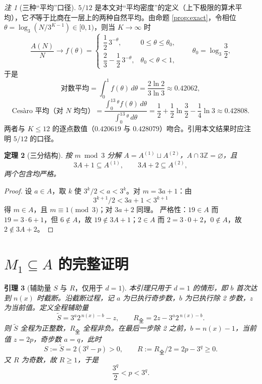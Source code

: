 \documentclass[11pt]{article}
\newtheorem{theorem}{定理}[section]
\newtheorem{lemma}[theorem]{引理}
\theoremstyle{definition}
\theoremstyle{definition}
\theoremstyle{remark}
\newtheorem{remark}[theorem]{注}
\begin{document}
\begin{remark}[三种“平均”口径]\label{rem:average}
\(5/12\) 是本文对“平均密度”的定义（上下极限的算术平均），它\emph{不}等于比商在一层上的两种自然平均。由命题 \ref{prop:exact}，令相位 \(\theta=\log_3(N/3^{K-1})\in[0,1)\)，则当 \(K\to\infty\) 时
\[
\frac{A(N)}{N}\longrightarrow f(\theta)=
\begin{cases}
\dfrac12\,3^{-\theta}, & 0\le\theta\le\theta_0,\\[2mm]
\dfrac23-\dfrac12\,3^{-\theta}, & \theta_0<\theta<1,
\end{cases}
\qquad \theta_0=\log_3\frac32,
\]
于是
\[
\text{对数平均}=\int_0^1f(\theta)\,d\theta=\frac{2\ln2}{3\ln3}\approx0.42062,
\]
\[
\text{Cesàro 平均（对 \(N\) 均匀）}
=\frac{\int_0^13^\theta f(\theta)\,d\theta}{\int_0^13^\theta\,d\theta}
=\frac12+\frac12\ln\frac32-\frac14\ln3\approx0.42808 .
\]
两者与 \(K\le12\) 的逐点数值（\(0.420619\) 与 \(0.428079\)）吻合。引用本文结果时应注明 \(5/12\) 的口径。
\end{remark}

\begin{theorem}[三分结构]\label{thm:times3}
按 \(m\bmod3\) 分解 \(A=A^{(1)}\sqcup A^{(2)}\)，\(A\cap3\mathbb Z=\varnothing\)，且
\[
3A+1\subseteq A^{(1)},\qquad 3A+2\subseteq A^{(2)},
\]
两个包含均严格。
\end{theorem}

\begin{proof}
设 \(a\in A\)，取 \(k\) 使 \(3^k/2<a<3^k\)。对 \(m=3a+1\)：由
\[
3^{k+1}/2<3a+1<3^{k+1}
\]
得 \(m\in A\)，且 \(m\equiv1\pmod3\)；对 \(3a+2\) 同理。
严格性：\(19\in A\) 而 \(19=3\cdot6+1\)，但 \(6\notin A\)，故 \(19\notin3A+1\)；\(2\in A\) 而 \(2=3\cdot0+2\)，\(0\notin A\)，故 \(2\notin3A+2\)。
\end{proof}

\section{\(M_1\subseteq A\) 的完整证明}

\begin{lemma}[辅助量 \(S\) 与 \(R\)，仅用于 \(d=1\)]\label{lem:SR}
本引理只用于 \(d=1\) 的情形，即 \(b\) 首次达到 \(n(x)\) 时截断。沿截断过程，记 \(a\) 为已执行奇步数，\(b\) 为已执行除 2 步数，\(z\) 为当前值。定义全程辅助量
\[
\tilde S=3^a2^{\,n(x)-b}-z,\qquad
R_{\text{全}}=2z-3^a2^{\,n(x)-b}.
\]
则 \(\tilde S\) 全程为正整数，\(R_{\text{全}}\) 全程非负。在最后一步除 2 之前，\(b=n(x)-1\)，当前值 \(z=2p\)，奇步数 \(a=q\)，此时
\[
S:=\tilde S=2(3^q-p)>0,\qquad R:=R_{\text{全}}/2=2p-3^q\ge0.
\]
又 \(R\) 为奇数，故 \(R\ge1\)，于是
\[
\frac{3^q}{2}<p<3^q.
\]
\end{lemma}
\end{document}
